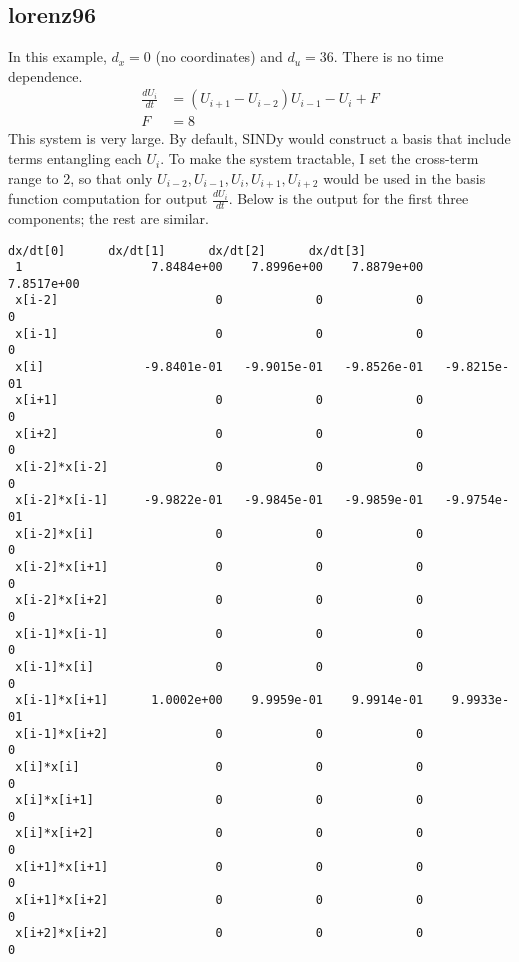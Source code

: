 \documentclass{article}
\begin{document}
\subsection{lorenz96}
In this example, $d_x = 0$ (no coordinates) and $d_u = 36$. There is no time dependence.
\begin{align*}
\frac{dU_i}{dt} &= (U_{i+1} - U_{i-2}) U_{i-1} - U_i + F \\
F &= 8
\end{align*}
This system is very large. By default, SINDy would construct a basis that
include terms entangling each $U_i$. To make the system tractable, I set the
cross-term range to 2, so that only $U_{i-2},U_{i-1},U_i,U_{i+1},U_{i+2}$ would
be used in the basis function computation for output $\frac{dU_i}{dt}$. Below is
the output for the first three components; the rest are similar.
\begin{lstlisting}[language={}]
                     dx/dt[0]      dx/dt[1]      dx/dt[2]      dx/dt[3] 
 1                  7.8484e+00    7.8996e+00    7.8879e+00    7.8517e+00
 x[i-2]                      0             0             0             0
 x[i-1]                      0             0             0             0
 x[i]              -9.8401e-01   -9.9015e-01   -9.8526e-01   -9.8215e-01
 x[i+1]                      0             0             0             0
 x[i+2]                      0             0             0             0
 x[i-2]*x[i-2]               0             0             0             0
 x[i-2]*x[i-1]     -9.9822e-01   -9.9845e-01   -9.9859e-01   -9.9754e-01
 x[i-2]*x[i]                 0             0             0             0
 x[i-2]*x[i+1]               0             0             0             0
 x[i-2]*x[i+2]               0             0             0             0
 x[i-1]*x[i-1]               0             0             0             0
 x[i-1]*x[i]                 0             0             0             0
 x[i-1]*x[i+1]      1.0002e+00    9.9959e-01    9.9914e-01    9.9933e-01
 x[i-1]*x[i+2]               0             0             0             0
 x[i]*x[i]                   0             0             0             0
 x[i]*x[i+1]                 0             0             0             0
 x[i]*x[i+2]                 0             0             0             0
 x[i+1]*x[i+1]               0             0             0             0
 x[i+1]*x[i+2]               0             0             0             0
 x[i+2]*x[i+2]               0             0             0             0
\end{lstlisting}
\end{document}
